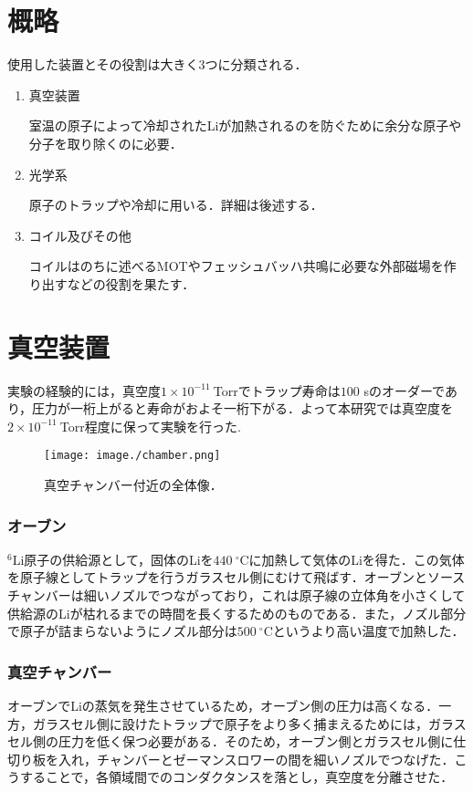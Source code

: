 \documentclass[11pt,a4j,notitlepage]{jreport}
\begin{document}
\section{概略}
使用した装置とその役割は大きく3つに分類される．
\begin{enumerate}
	\item 真空装置
	
		室温の原子によって冷却されたLiが加熱されるのを防ぐために余分な原子や分子を取り除くのに必要．
	\item 光学系
	
		原子のトラップや冷却に用いる．詳細は後述する．
	\item コイル及びその他
	
		コイルはのちに述べるMOTやフェッシュバッハ共鳴に必要な外部磁場を作り出すなどの役割を果たす．
\end{enumerate}

\section{真空装置}
実験の経験的には，真空度$1 \times 10^{-11} \ $Torrでトラップ寿命は$100$ sのオーダーであり，圧力が一桁上がると寿命がおよそ一桁下がる．よって本研究では真空度を$2 \times 10^{-11} \ $Torr程度に保って実験を行った.

\begin{figure}[h]
	\centering
		\texttt{[image: image./chamber.png]}
	\caption{真空チャンバー付近の全体像．}
	\label{fig3.2.1}
\end{figure}

\subsubsection{オーブン}
$^6$Li原子の供給源として，固体のLiを$440\ ^{\circ}\mathrm{C}$に加熱して気体のLiを得た．この気体を原子線としてトラップを行うガラスセル側にむけて飛ばす．オーブンとソースチャンバーは細いノズルでつながっており，これは原子線の立体角を小さくして供給源のLiが枯れるまでの時間を長くするためのものである．また，ノズル部分で原子が詰まらないようにノズル部分は$500\ ^{\circ}\mathrm{C}$というより高い温度で加熱した．

\subsubsection{真空チャンバー}
オーブンでLiの蒸気を発生させているため，オーブン側の圧力は高くなる．一方，ガラスセル側に設けたトラップで原子をより多く捕まえるためには，ガラスセル側の圧力を低く保つ必要がある．そのため，オーブン側とガラスセル側に仕切り板を入れ，チャンバーとゼーマンスロワーの間を細いノズルでつなげた．こうすることで，各領域間でのコンダクタンスを落とし，真空度を分離させた．
\end{document}
